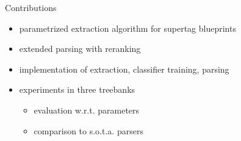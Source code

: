 \documentclass[slides]{subfiles}
\begin{document}
    \begin{frame}{Contributions}
        \begin{minipage}{.5\linewidth}
            \begin{itemize}
                \item<2-> parametrized extraction algorithm for supertag blueprints
                \item<3-> extended parsing with reranking
                \item<5-> implementation of extraction, classifier training, parsing
                \item<6-> experiments in three treebanks
                \begin{itemize}
                    \item evaluation w.r.t. parameters
                    \item comparison to s.o.t.a. parsers
                \end{itemize}
            \end{itemize}
        \end{minipage}

        \vspace*{-3cm}
        \null\hfill{}\resizebox{.8\linewidth}{!}{}
    \end{frame}
\end{document}
